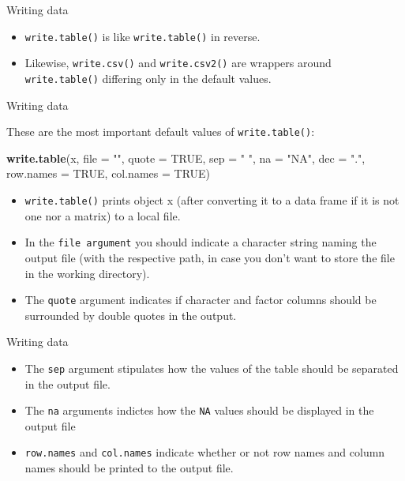 \documentclass[ignorenonframetext,]{beamer}
\newenvironment{Shaded}{\begin{snugshade}}{\end{snugshade}}
\newcommand{\DataTypeTok}[1]{\textcolor[rgb]{0.13,0.29,0.53}{#1}}
\newcommand{\KeywordTok}[1]{\textcolor[rgb]{0.13,0.29,0.53}{\textbf{#1}}}
\newcommand{\NormalTok}[1]{#1}
\newcommand{\OtherTok}[1]{\textcolor[rgb]{0.56,0.35,0.01}{#1}}
\newcommand{\StringTok}[1]{\textcolor[rgb]{0.31,0.60,0.02}{#1}}
\begin{document}
\begin{frame}[fragile]{Writing data}
\protect\hypertarget{writing-data-1}{}

\begin{itemize}
\item
  \texttt{write.table()} is like \texttt{write.table()} in reverse.
\item
  Likewise, \texttt{write.csv()} and \texttt{write.csv2()} are wrappers
  around \texttt{write.table()} differing only in the default values.
\end{itemize}

\end{frame}

\begin{frame}[fragile]{Writing data}
\protect\hypertarget{writing-data-2}{}

These are the most important default values of \texttt{write.table()}:

\begin{Shaded}
\begin{Highlighting}[]
\KeywordTok{write.table}\NormalTok{(x, }\DataTypeTok{file =} \StringTok{""}\NormalTok{, }\DataTypeTok{quote =} \OtherTok{TRUE}\NormalTok{, }\DataTypeTok{sep =} \StringTok{" "}\NormalTok{,}
            \DataTypeTok{na =} \StringTok{"NA"}\NormalTok{, }\DataTypeTok{dec =} \StringTok{"."}\NormalTok{, }\DataTypeTok{row.names =} \OtherTok{TRUE}\NormalTok{,}
            \DataTypeTok{col.names =} \OtherTok{TRUE}\NormalTok{)}
\end{Highlighting}
\end{Shaded}

\begin{itemize}
\item
  \texttt{write.table()} prints object x (after converting it to a data
  frame if it is not one nor a matrix) to a local file.
\item
  In the \texttt{file\ argument} you should indicate a character string
  naming the output file (with the respective path, in case you don't
  want to store the file in the working directory).
\item
  The \texttt{quote} argument indicates if character and factor columns
  should be surrounded by double quotes in the output.
\end{itemize}

\end{frame}

\begin{frame}[fragile]{Writing data}
\protect\hypertarget{writing-data-3}{}

\begin{itemize}
\item
  The \texttt{sep} argument stipulates how the values of the table
  should be separated in the output file.
\item
  The \texttt{na} arguments indictes how the \texttt{NA} values should
  be displayed in the output file
\item
  \texttt{row.names} and \texttt{col.names} indicate whether or not row
  names and column names should be printed to the output file.
\end{itemize}

\end{frame}
\end{document}
